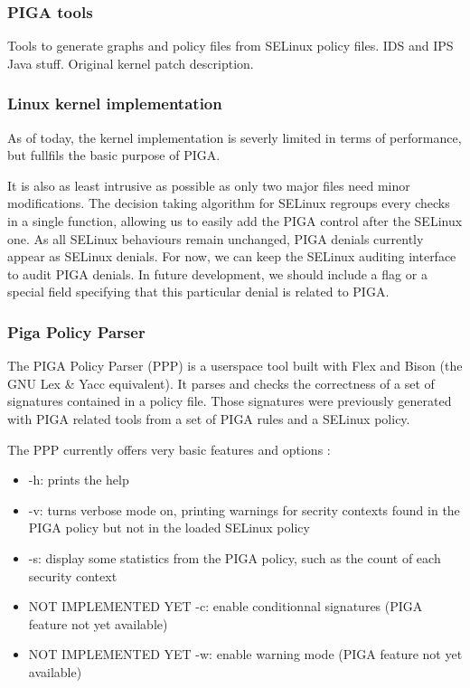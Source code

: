 \documentclass[pdftex,a4paper,titlepage,11pt]{article}
\begin{document}
\subsubsection{PIGA tools}

Tools to generate graphs and policy files from SELinux policy files. IDS and IPS Java stuff. Original kernel patch description.

\subsubsection{Linux kernel implementation}

As of today, the kernel implementation is severly limited in terms of performance, but fullfils the basic purpose of PIGA.

It is also as least intrusive as possible as only two major files need minor modifications. The decision taking algorithm for SELinux regroups every checks in a single function, allowing us to easily add the PIGA control after the SELinux one.
As all SELinux behaviours remain unchanged, PIGA denials currently appear as SELinux denials. For now, we can keep the SELinux auditing interface to audit PIGA denials. In future development, we should include a flag or a special field specifying that this particular denial is related to PIGA.


\subsubsection{Piga Policy Parser}

The PIGA Policy Parser (PPP) is a userspace tool built with Flex and Bison (the GNU Lex \& Yacc equivalent). It parses and checks the correctness of a set of signatures contained in a policy file. Those signatures were previously generated with PIGA related tools from a set of PIGA rules and a SELinux policy.

The PPP currently offers very basic features and options :
\begin{itemize}
	\item -h: prints the help
	\item -v: turns verbose mode on, printing warnings for secrity contexts found in the PIGA policy but not in the loaded SELinux policy
	\item -s: display some statistics from the PIGA policy, such as the count of each security context
	\item NOT IMPLEMENTED YET -c: enable conditionnal signatures (PIGA feature not yet available)
	\item NOT IMPLEMENTED YET -w: enable warning mode (PIGA feature not yet available)
\end{itemize}
\end{document}
